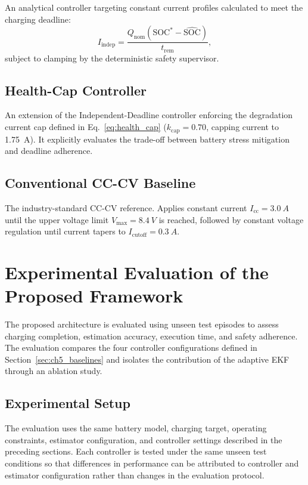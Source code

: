 An analytical controller targeting constant current profiles calculated to meet the charging deadline:
\begin{equation}
  I_{\mathrm{indep}} = \frac{Q_{\mathrm{nom}} (\mathrm{SOC}^{*} - \widehat{\mathrm{SOC}})}{t_{\mathrm{rem}}},
\end{equation}
subject to clamping by the deterministic safety supervisor.

\subsection{Health-Cap Controller}
\label{subsec:ch5_health_baseline}

An extension of the Independent-Deadline controller enforcing the degradation current cap defined in Eq.~\ref{eq:health_cap} ($k_{\mathrm{cap}} = 0.70$, capping current to \SI{1.75}{A}). It explicitly evaluates the trade-off between battery stress mitigation and deadline adherence.

\subsection{Conventional CC-CV Baseline}
\label{subsec:ch5_cccv}

The industry-standard CC-CV reference. Applies constant current $I_{\mathrm{cc}} = \SI{3.0}{A}$ until the upper voltage limit $V_{\mathrm{max}} = \SI{8.4}{V}$ is reached, followed by constant voltage regulation until current tapers to $I_{\mathrm{cutoff}} = \SI{0.3}{A}$.

\section[Experimental Evaluation of the Framework]{Experimental Evaluation of the Proposed Framework}
\label{sec:ch5_evaluation}

The proposed architecture is evaluated using unseen test episodes to assess charging completion, estimation accuracy, execution time, and safety adherence. The evaluation compares the four controller configurations defined in Section~\ref{sec:ch5_baselines} and isolates the contribution of the adaptive EKF through an ablation study.

\subsection{Experimental Setup}

The evaluation uses the same battery model, charging target, operating constraints, estimator configuration, and controller settings described in the preceding sections. Each controller is tested under the same unseen test conditions so that differences in performance can be attributed to controller and estimator configuration rather than changes in the evaluation protocol.

